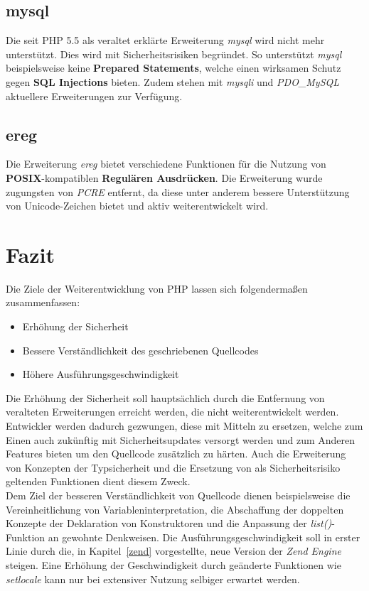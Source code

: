     \subsection{mysql}
    Die seit \acs{PHP} 5.5 als veraltet erklärte Erweiterung \textit{mysql} wird nicht mehr unterstützt. Dies wird mit Sicherheitsrisiken begründet. So unterstützt
    \textit{mysql} beispielsweise keine \textbf{Prepared Statements}, welche einen wirksamen Schutz gegen \textbf{SQL Injections} bieten. \cite{oracle_mysql_nodate}
    Zudem stehen mit \textit{mysqli} und \textit{PDO\_MySQL} aktuellere Erweiterungen zur Verfügung.
    
    \subsection{ereg}\label{ereg}
    Die Erweiterung \textit{ereg} bietet verschiedene Funktionen für die Nutzung von \textbf{POSIX}-kompatiblen \textbf{Regulären Ausdrücken}. Die Erweiterung wurde
    zugungsten von \textit{\acs{PCRE}} entfernt, da diese unter anderem bessere Unterstützung von Unicode-Zeichen bietet und aktiv weiterentwickelt wird. \cite{popov_php:_2014}

\section{Fazit}
Die Ziele der Weiterentwicklung von \acs{PHP} lassen sich folgendermaßen zusammenfassen:
\begin{itemize}
    \item Erhöhung der Sicherheit
    \item Bessere Verständlichkeit des geschriebenen Quellcodes
    \item Höhere Ausführungsgeschwindigkeit
\end{itemize}  
Die Erhöhung der Sicherheit soll hauptsächlich durch die Entfernung von veralteten Erweiterungen erreicht werden, die nicht weiterentwickelt werden. Entwickler werden dadurch gezwungen,
diese mit Mitteln zu ersetzen, welche zum Einen auch zukünftig mit Sicherheitsupdates versorgt werden und zum Anderen Features bieten um den Quellcode zusätzlich
zu härten. Auch die Erweiterung von Konzepten der Typsicherheit und die Ersetzung von als Sicherheitsrisiko geltenden Funktionen dient diesem Zweck.\\
Dem Ziel der besseren Verständlichkeit von Quellcode dienen beispielsweise die Vereinheitlichung von Variableninterpretation, die Abschaffung der doppelten Konzepte
der Deklaration von Konstruktoren und die Anpassung der \textit{list()}-Funktion an gewohnte Denkweisen. Die Ausführungsgeschwindigkeit 
soll in erster Linie durch die, in Kapitel~\ref{zend} vorgestellte, neue Version der \textit{Zend Engine} steigen. Eine Erhöhung der Geschwindigkeit durch 
geänderte Funktionen wie \textit{setlocale} kann nur bei extensiver Nutzung selbiger erwartet werden.